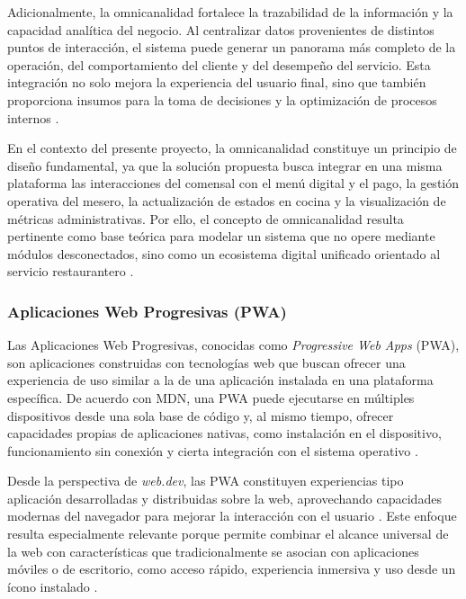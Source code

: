 \documentclass[12pt]{report}
\begin{document}
Adicionalmente, la omnicanalidad fortalece la trazabilidad de la información y la capacidad analítica del negocio. Al centralizar datos provenientes de distintos puntos de interacción, el sistema puede generar un panorama más completo de la operación, del comportamiento del cliente y del desempeño del servicio. Esta integración no solo mejora la experiencia del usuario final, sino que también proporciona insumos para la toma de decisiones y la optimización de procesos internos \cite{shopify_omnichannel_operations_2025,shopify_omnichannel_experience_2025}.

En el contexto del presente proyecto, la omnicanalidad constituye un principio de diseño fundamental, ya que la solución propuesta busca integrar en una misma plataforma las interacciones del comensal con el menú digital y el pago, la gestión operativa del mesero, la actualización de estados en cocina y la visualización de métricas administrativas. Por ello, el concepto de omnicanalidad resulta pertinente como base teórica para modelar un sistema que no opere mediante módulos desconectados, sino como un ecosistema digital unificado orientado al servicio restaurantero \cite{deliverect_omnichannel_restaurant_2024,shopify_omnichannel_operations_2025}.

\subsubsection{Aplicaciones Web Progresivas (PWA)}

Las Aplicaciones Web Progresivas, conocidas como \textit{Progressive Web Apps} (PWA), son aplicaciones construidas con tecnologías web que buscan ofrecer una experiencia de uso similar a la de una aplicación instalada en una plataforma específica. De acuerdo con MDN, una PWA puede ejecutarse en múltiples dispositivos desde una sola base de código y, al mismo tiempo, ofrecer capacidades propias de aplicaciones nativas, como instalación en el dispositivo, funcionamiento sin conexión y cierta integración con el sistema operativo \cite{mdn_pwa_2025,mdn_what_is_pwa_2025}.

Desde la perspectiva de \textit{web.dev}, las PWA constituyen experiencias tipo aplicación desarrolladas y distribuidas sobre la web, aprovechando capacidades modernas del navegador para mejorar la interacción con el usuario \cite{webdev_pwa_overview,webdev_learn_pwa}. Este enfoque resulta especialmente relevante porque permite combinar el alcance universal de la web con características que tradicionalmente se asocian con aplicaciones móviles o de escritorio, como acceso rápido, experiencia inmersiva y uso desde un ícono instalado \cite{mdn_pwa_2025,mdn_manifest_2025}.
\end{document}

